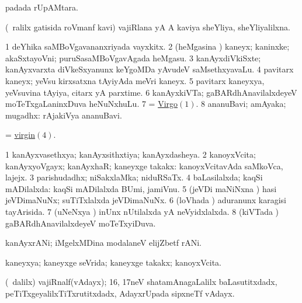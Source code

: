 \bentry
{} 
\gl{\nA}
\expl{}
\bmng
  padada rUpAMtara. 
\emng
\eentry

\bentry
{} 
\gl{\gu}
\expl{}
\bmng
 (\kirxpU\ ralilx gatisida roVmanf kavi) vajiRlana yA A kaviya sheYliya, sheYliyalilxna. 
\emng
\eentry

\bentry
{} 
\gl{\nA}
\expl{}
\bmng
\bnum
\num{1} deYhika saMBoVgavananxriyada vayxkitx. 
\num{2} (heMgasina \vi) kaneyx; kaninxke; akaSxtayoVni; puruSasaMBoVgavAgada heMgasu. 
\num{3} kanAyxdiVkiSxte; kanAyxvarxta diVkeSxyanunx keYgoMDa yAvudeV saMsethxyavaLu. 
\hypertarget{virgin(4)}{} 
\num{4} pavitarx kaneyx; yeVsu kirxsatxna tAyiyAda meVri kaneyx. 
\num{5} pavitarx kaneyxya, yeVsuvina tAyiya, citarx yA parxtime. 
\num{6} kanAyxkiVTa; gaBARdhAnavilalxdeyeV moTeTxgaLaninxDuva heNuNxhuLu. 
\num{7} = \hyperlink{Virgo}{Virgo\((1)\)}. 
\num{8} ananuBavi; amAyaka; mugadhx:  rAjakiVya ananuBavi. 
\enum
\emng

\noindent 
\gl{\pagu}
\expl{}
\bmng
  = \hyperlink{virgin(4)}{virgin\((4)\)}. 
\emng
\eentry

\bentry
{} 
\gl{\gu}
\expl{}
\bmng
\bnum
\num{1} kanAyxvasethxya; kanAyxsithxtiya; kanAyxdasheya. 
\num{2} kanoyxVcita; kanAyxyoVgayx; kanAyxhaR; kaneyxge takakx:  kanoyxVcitavAda saMkoVca, lajejx. 
\num{3} parishudadhx; niSakxlaMka; niduRSaTx. 
\num{4} baLasilalxda; kaqSi mADilalxda:  kaqSi mADilalxda BUmi, jamiVnu. 
\num{5} (jeVDi maNiNxna \vi) hasi jeVDimaNuNx; suTiTxlalxda jeVDimaNuNx. 
\num{6} (loVhada \vi) aduranunx karagisi tayArisida. 
\num{7} (uNeNxya \vi) inUnx nUtilalxda yA neVyidxlalxda. 
\num{8} (kiVTada \vi) gaBARdhAnavilalxdeyeV moTeTxyiDuva. 
\enum
\emng

\noindent 
\gl{\pagu}
\expl{}
\bmng
  kanAyxrANi; iMgelxMDina modalaneV elijZbetf rANi. 
\emng
\eentry

\bentry 
{} 
\gl{\gu}
\expl{}
\bmng
 kaneyxya; kaneyxge seVrida; kaneyxge takakx; kanoyxVcita. 
\emng
\eentry

\bentry
{} 
\gl{\nA}
\expl{}
\bmng
 (\sA\ \bava dalilx) vajiRnalf(vAdayx); 16, 17neV shatamAnagaLalilx baLasutitxdadx, peTiTxgeyalilxTiTxrutitxdadx, AdayxrUpada sipxneTf  vAdayx.  
\emng

